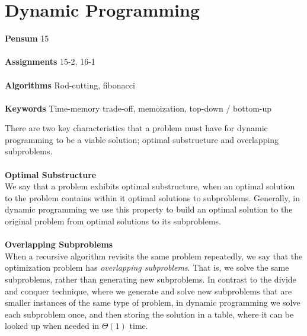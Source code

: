 
\chapter{Dynamic Programming}
\label{ch:dynamicprogramming}

\textbf{Pensum} 15 \cite{clrs} \\\\
\textbf{Assignments} 15-2, 16-1 \\\\
\textbf{Algorithms} Rod-cutting, fibonacci \\\\
\textbf{Keywords} Time-memory trade-off, memoization, top-down / bottom-up
\vspace{1in}

\noindent There are two key characteristics that a problem must have for
dynamic programming to be a viable solution; optimal substructure and
overlapping subproblems.
\\\\
\noindent \textbf{Optimal Substructure}\\
We say that a problem exhibits optimal substructure, when an optimal solution
to the problem contains within it optimal solutions to subproblems. Generally,
in dynamic programming we use this property to build an optimal solution to
the original problem from optimal solutions to its subproblems.
\\\\
\noindent \textbf{Overlapping Subproblems}\\
When a recursive algorithm revisits the same problem repeatedly, we say that
the optimization problem has \textit{overlapping subproblems}. That is, we
solve the same subproblems, rather than generating new subproblems. In
contrast to the divide and conquer technique, where we generate and solve new
subproblems that are smaller instances of the same type of problem, in dynamic
programming we solve each subproblem once, and then storing the solution in a
table, where it can be looked up when needed in $\Theta(1)$ time.

\newpage
